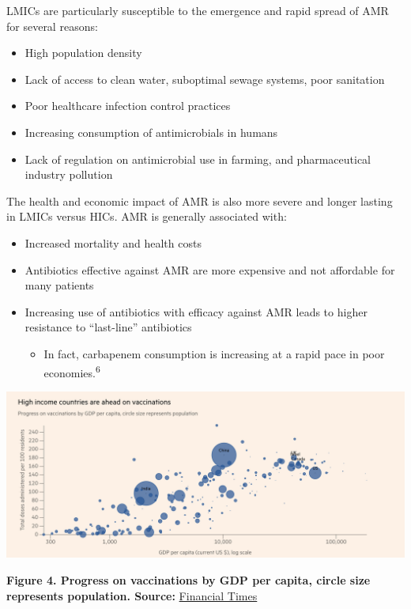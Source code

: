 \documentclass[
]{book}
\providecommand{\tightlist}{%
  \setlength{\itemsep}{0pt}\setlength{\parskip}{0pt}}
\begin{document}
LMICs are particularly susceptible to the emergence and rapid spread of AMR for several reasons:

\begin{itemize}
\tightlist
\item
  High population density
\item
  Lack of access to clean water, suboptimal sewage systems, poor sanitation
\item
  Poor healthcare infection control practices
\item
  Increasing consumption of antimicrobials in humans
\item
  Lack of regulation on antimicrobial use in farming, and pharmaceutical industry pollution
\end{itemize}

The health and economic impact of AMR is also more severe and longer lasting in LMICs versus HICs. AMR is generally associated with:

\begin{itemize}
\item
  Increased mortality and health costs
\item
  Antibiotics effective against AMR are more expensive and not affordable for many patients
\item
  Increasing use of antibiotics with efficacy against AMR leads to higher resistance to ``last-line'' antibiotics

  \begin{itemize}
  \item
    In fact, carbapenem consumption is increasing at a rapid pace in poor economies.\textsuperscript{6}
  \end{itemize}
\end{itemize}

\includegraphics[width=6.25in,height=\textheight]{images/ft_vaccine differences.png}

\textbf{Figure 4. Progress on vaccinations by GDP per capita, circle size represents population. Source:} \href{https://www.ft.com/visual-and-data-journalism}{Financial Times}
\end{document}
